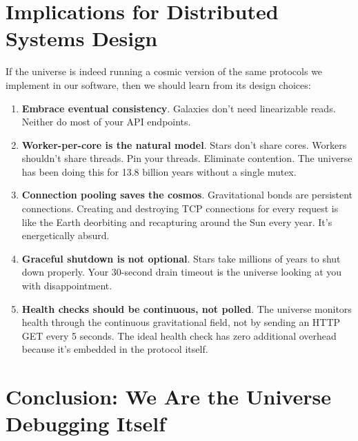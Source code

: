 \documentclass[12pt,a4paper]{article}
\begin{document}
\section{Implications for Distributed Systems Design}

If the universe is indeed running a cosmic version of the same protocols
we implement in our software, then we should learn from its design choices:

\begin{enumerate}
    \item \textbf{Embrace eventual consistency}. Galaxies don't need
    linearizable reads. Neither do most of your API endpoints.

    \item \textbf{Worker-per-core is the natural model}. Stars don't share
    cores. Workers shouldn't share threads. Pin your threads. Eliminate
    contention. The universe has been doing this for 13.8 billion years
    without a single mutex.

    \item \textbf{Connection pooling saves the cosmos}. Gravitational bonds
    are persistent connections. Creating and destroying TCP connections for
    every request is like the Earth deorbiting and recapturing around the
    Sun every year. It's energetically absurd.

    \item \textbf{Graceful shutdown is not optional}. Stars take millions
    of years to shut down properly. Your 30-second drain timeout is the
    universe looking at you with disappointment.

    \item \textbf{Health checks should be continuous, not polled}. The
    universe monitors health through the continuous gravitational field,
    not by sending an HTTP GET every 5 seconds. The ideal health check
    has zero additional overhead because it's embedded in the protocol
    itself.
\end{enumerate}

\section{Conclusion: We Are the Universe Debugging Itself}
\end{document}
